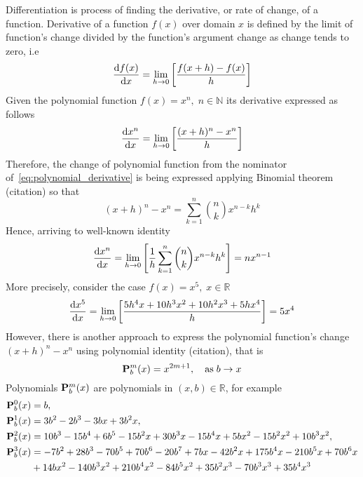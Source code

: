 Differentiation is process of finding the derivative, or rate of change, of a function.
Derivative of a function $f(x)$ over domain $x$ is defined by the limit of function's change divided
by the function's argument change as change tends to zero, i.e
\begin{equation*}
    \odv{f(x)}{x} = \lim_{h \to 0} \left[ \frac{f(x+h) - f(x)}{h} \right]
\end{equation*}
Given the polynomial function $f(x)=x^n, \; n \in \mathbb{N}$ its derivative expressed as follows
\begin{equation}
    \odv{x^n}{x} = \lim_{h \to 0} \left[ \frac{(x+h)^n - x^n}{h} \right] \label{eq:polynomial_derivative}
\end{equation}
Therefore, the change of polynomial function from the nominator of~\eqref{eq:polynomial_derivative}
is being expressed applying Binomial theorem (citation) so that
\begin{equation*}
(x+h)
    ^n - x^n = \sum_{k=1}^{n} \binom{n}{k} x^{n-k} h^k
\end{equation*}
Hence, arriving to well-known identity
\begin{equation*}
    \odv{x^n}{x} = \lim_{h \to 0} \left[ \frac{1}{h} \sum_{k=1}^{n} \binom{n}{k} x^{n-k} h^k \right] = n x^{n-1}
\end{equation*}
More precisely, consider the case $f(x) = x^5, \; x\in\mathbb{R}$
\begin{equation*}
    \odv{x^5}{x} = \lim_{h \to 0} \left[ \frac{5 h^4 x + 10 h^3 x^2 + 10 h^2 x^3 + 5 h x^4}{h} \right] = 5x^4
\end{equation*}
However, there is another approach to express the polynomial function's change $(x+h)^n - x^n$ using polynomial identity
(citation), that is
\begin{equation*}
    {\mathbf{P}}\sp{m} \sb{b}(x) = x^{2m+1}, \quad \mathrm{as} \; b \to x
\end{equation*}
Polynomials ${\mathbf{P}}\sp{m} \sb{b}(x)$ are polynomials in $(x,b) \in \mathbb{R}$, for example
\begin{equation*}
    \begin{split}
        {\mathbf{P}}\sp{0} \sb{b}(x)
        &=b, \\
        {\mathbf{P}}\sp{1} \sb{b}(x)
        &=3 b^2 - 2 b^3 - 3 b x + 3 b^2 x, \\
        {\mathbf{P}}\sp{2} \sb{b}(x)
        &=10 b^3 - 15 b^4 + 6 b^5 - 15 b^2 x + 30 b^3 x - 15 b^4 x + 5 b x^2 - 15 b^2 x^2 + 10 b^3 x^2, \\
        {\mathbf{P}}\sp{3} \sb{b}(x)
        &=-7 b^2 + 28 b^3 - 70 b^5 + 70 b^6 - 20 b^7 + 7 b x - 42 b^2 x + 175 b^4 x - 210 b^5 x + 70 b^6 x \\
        &+ 14 b x^2 - 140 b^3 x^2 + 210 b^4 x^2 - 84 b^5 x^2 + 35 b^2 x^3 - 70 b^3 x^3 + 35 b^4 x^3
    \end{split}
\end{equation*}
